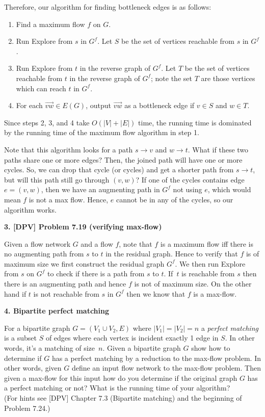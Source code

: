 \documentclass{article}
\begin{document}
Therefore, our algorithm for finding bottleneck edges is as follows: 
\begin{enumerate}
\item Find a maximum flow $f$ on $G$.
\item Run Explore from $s$ in $G^f$. Let $S$ be the set of vertices reachable from $s$ in $G^f$.
\item Run Explore from $t$ in the reverse graph of $G^f$. 
Let $T$ be the set of vertices reachable from $t$ in the reverse graph of $G^f$; note
the set $T$ are those vertices which can reach $t$ in $G^f$.
\item For each  $\overrightarrow{vw} \in E(G)$, output $\overrightarrow{vw}$ 
as a bottleneck edge if $v \in S$ and $w \in T$.
\end{enumerate}

Since steps 2, 3, and 4 take $O(|V|+|E|)$ time, the running time is dominated by the running time of the maximum flow algorithm in step 1.

Note that this algorithm looks for a path $s \rightarrow v$ and $w \rightarrow t$. What if these two paths share one or more edges? Then, the joined path will have one or more cycles. So, we can drop that cycle (or cycles) and get a shorter path from $s \rightarrow t$, but will this path still go through $(v,w)$? If one of the cycles contains edge $e=(v,w)$, then we have an augmenting path in $G^f$ not using $e$, which would mean $f$ is not a max flow. Hence, $e$ cannot be in any of the cycles, so our algorithm works.


\newpage
	
{\noindent \bf  3. [DPV] Problem 7.19 (verifying max-flow)  }
	
	Given a flow network $G$ and a flow $f$, note that $f$ is a maximum flow
	iff there is no augmenting path from $s$ to $t$ in the residual graph.
	 Hence to verify that $f$ is of maximum size
	we first construct the residual graph $G^f$.  We then run Explore from $s$ on $G^f$ 
	to check if there is a path from $s$ to $t$.  If~$t$ is reachable from $s$ then
	there is an augmenting path and hence $f$ is not of maximum size.
	On the other hand if $t$ is not reachable from $s$ in $G^f$ then we know that $f$ is
	a max-flow.

\newpage

{\noindent  \bf 4. Bipartite perfect matching}

  For a bipartite graph $G=(V_1\cup V_2,E)$ where $|V_1|=|V_2|=n$ a {\em 
	perfect matching} is a subset $S$ of edges where each vertex is incident exactly 1
	edge in $S$.  In other words, it's a matching of size~$n$.   Given a bipartite graph $G$
	show how to determine if $G$ has a perfect matching by a reduction to the max-flow 
	problem. In other words, 
	given $G$ define an input flow network to the max-flow problem.  Then given a max-flow
	for this input how do you determine if the original graph $G$ has a perfect matching or not?
	What is the running time of your algorithm? \\
	(For hints see [DPV] Chapter 7.3 (Bipartite matching) and the beginning of Problem 7.24.)
\end{document}
